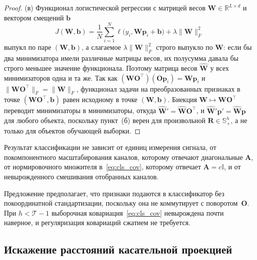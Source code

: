 \begin{proof}
(в) Функционал логистической регрессии с матрицей весов $\mathbf{W} \in \mathbb{R}^{L \times d}$ и вектором смещений $\mathbf{b}$
\begin{equation*}
J(\mathbf{W}, \mathbf{b}) = \frac{1}{N} \sum_{i=1}^{N} \ell\big( y_i, \mathbf{W}\mathbf{p}_i + \mathbf{b} \big) + \lambda \|\mathbf{W}\|_F^2
\end{equation*}
выпукл по паре $(\mathbf{W}, \mathbf{b})$, а слагаемое $\lambda\|\mathbf{W}\|_F^2$ строго выпукло по $\mathbf{W}$: если бы два минимизатора имели различные матрицы весов, их полусумма давала бы строго меньшее значение функционала. Поэтому матрица весов $\hat{\mathbf{W}}$ у всех минимизаторов одна и та же. Так как $(\mathbf{W}\mathbf{O}^{\top})(\mathbf{O}\mathbf{p}_i) = \mathbf{W}\mathbf{p}_i$ и $\|\mathbf{W}\mathbf{O}^{\top}\|_F = \|\mathbf{W}\|_F$, функционал задачи на преобразованных признаках в точке $(\mathbf{W}\mathbf{O}^{\top}, \mathbf{b})$ равен исходному в точке $(\mathbf{W}, \mathbf{b})$. Биекция $\mathbf{W} \mapsto \mathbf{W}\mathbf{O}^{\top}$ переводит минимизаторы в минимизаторы, откуда $\hat{\mathbf{W}}' = \hat{\mathbf{W}}\mathbf{O}^{\top}$, и $\hat{\mathbf{W}}'\mathbf{p}' = \hat{\mathbf{W}}\mathbf{p}$ для любого объекта, поскольку пункт~(б) верен для произвольной $\mathbf{R} \in \mathbb{S}_{+}^{h}$, а не только для объектов обучающей выборки.
\end{proof}

\begin{corollary}\label{cor:cls_units}
Результат классификации не зависит от единиц измерения сигнала, от покомпонентного масштабирования каналов, которому отвечают диагональные $\mathbf{A}$, от нормировочного множителя в~\eqref{eq:cls_cov}, которому отвечает $\mathbf{A} = c\mathbb{I}$, и от невырожденного смешивания отобранных каналов.
\end{corollary}

\begin{remark}
Предложение предполагает, что признаки подаются в классификатор без покоординатной стандартизации, поскольку она не коммутирует с поворотом~$\mathbf{O}$. При $h < \mathcal{T} - 1$ выборочная ковариация~\eqref{eq:cls_cov} невырождена почти наверное, и регуляризация ковариаций сжатием не требуется.
\end{remark}

\subsection{Искажение расстояний касательной проекцией}\label{sec3:cls_theory_dist}


